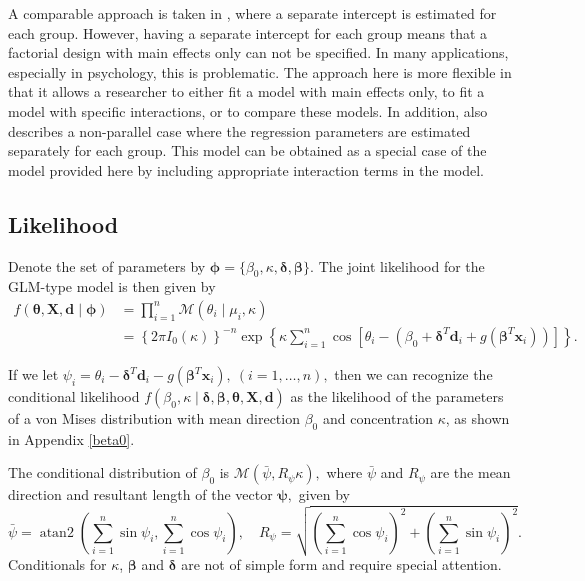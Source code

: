 \documentclass[11pt,a4paper]{article}\usepackage[]{graphicx}\usepackage[]{color}
\DeclareMathOperator{\atantwo}{atan2}
\newcommand{\bx}{\boldsymbol{x}}
\newcommand{\bX}{\boldsymbol{X}}
\newcommand{\bt}{\boldsymbol{\theta}}
\newcommand{\bd}{\boldsymbol{d}}
\newcommand{\bdt}{\boldsymbol{\delta}}
\newcommand{\bbt}{\boldsymbol{\beta}}
\newcommand{\bps}{\boldsymbol{\psi}}
\newcommand{\bph}{\boldsymbol{\phi}}
\begin{document}
A comparable approach is taken in \citet{artes2008hypothesis}, where a separate intercept is estimated for each group. However, having a separate intercept for each group means that a factorial design  with main effects only can not be specified. In many applications, especially in psychology, this is problematic. The approach here is more flexible in that it allows a researcher to either fit a model with main effects only, to fit a model with specific interactions, or to compare these models. In addition, \citet{artes2008hypothesis} also describes a non-parallel case where the regression parameters are estimated separately for each group. This model can be obtained as a special case of the model provided here by including appropriate interaction terms in the model.



\subsection{Likelihood}

Denote the set of parameters by \( \bph =  \{ \beta_0, \kappa, \bdt, \bbt \}.\) The joint likelihood for the GLM-type model is then given by
\begin{align}
f(\bt, \bX, \bd \mid \bph) &=  \prod_{i=1}^{n} \mathcal{M}(\theta_i \mid \mu_i, \kappa) \\
&=  \left\lbrace 2 \pi I_0(\kappa) \right\rbrace^{-n} \exp \left\lbrace \kappa \sum_{i=1}^{n} \cos \left[ \theta_i - \left( \beta_0 +  \bdt^T \bd_i + g(\bbt^T \bx_i) \right) \right]  \right\rbrace.
\end{align}

If we let \( \psi_i = \theta_i - \bdt^T\bd_i - g(\bbt^T \bx_i), ~ ( i = 1, \dots, n),\) then we can recognize the conditional likelihood \( f(\beta_0, \kappa \mid \bdt, \bbt, \bt, \bX, \bd) \) as the likelihood of the parameters of a von Mises distribution with mean direction \( \beta_0 \) and concentration \( \kappa \), as shown in Appendix \ref{beta0}.

The conditional distribution of \( \beta_0 \) is \( \mathcal{M}(\bar\psi, R_{\psi} \kappa), \) where \( \bar\psi \) and \( R_\psi \) are the mean direction and resultant length of the vector \( \bps, \) given by  \[ \bar\psi =  \atantwo \left( \sum_{i=1}^n \sin\psi_i, \sum_{i=1}^n \cos\psi_i \right), \quad R_\psi = \sqrt{ \left( \sum_{i=1}^n \cos\psi_i \right)^2 +  \left( \sum_{i=1}^n \sin\psi_i \right)^2 }.\]
Conditionals for \( \kappa \), \( \bbt \) and \( \bdt \) are not of simple form and require special attention. \label{condbeta0}
\end{document}
